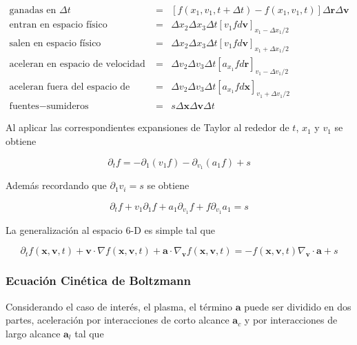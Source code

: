 \begin{eqnarray}
  \text{ganadas en } \Delta t &=& [f(x_1, v_{1}, t + \Delta t) - f(x_1, v_{1}, t)]\Delta\textbf{r}\Delta\textbf{v}\nonumber\\
  \text{entran en espacio f\'isico} &=& \Delta x_{2}\Delta x_{3}\Delta t[v_{1}fd\textbf{v}]_{x_1 - \Delta x_1/2} \nonumber\\
  \text{salen en espacio f\'isico} &=& \Delta x_{2}\Delta x_{3}\Delta t[v_{1}fd\textbf{v}]_{x_1 + \Delta x_1/2} \nonumber\\
  \text{aceleran en espacio de velocidad} &=& \Delta v_{2}\Delta v_{3}\Delta t[a_{x_1}fd\textbf{r}]_{v_{1} - \Delta v_{1}/2} \nonumber\\
  \text{aceleran fuera del espacio de velocidad} &=& \Delta v_{2}\Delta v_{3}\Delta t[a_{x_1}fd\textbf{x}]_{v_{1} + \Delta v_{1}/2} \nonumber\\
  \text{fuentes} - \text{sumideros} &=& s\Delta \textbf{x} \Delta\textbf{v}\Delta t \nonumber
\end{eqnarray}

Al aplicar las correspondientes expansiones de Taylor al rededor de $t$, $x_1$ y $v_1$ se obtiene 

\begin{equation*}
  \partial_t f = -\partial_{1}(v_1 f) - \partial_{v_1} (a_1 f) + s
\end{equation*}

Adem\'as recordando que $\partial_{1}v_i = s$ se obtiene

\begin{equation*}
  \partial_t f + v_1\partial_{1}f + a_1\partial_{v_1} f + f\partial_{v_1}a_1 = s
\end{equation*}
  
La generalizaci\'on al espacio 6-D es simple tal que 

\begin{equation*}
  \partial_t f(\textbf{x},\textbf{v}, t) + \textbf{v}\cdot\nabla f(\textbf{x}, \textbf{v}, t) + \textbf{a}\cdot\nabla_{\textbf{v}} f(\textbf{x}, \textbf{v}, t)= -f(\textbf{x}, \textbf{v}, t)\nabla_\textbf{v}\cdot \textbf{a} + s 
\end{equation*}

\subsubsection{Ecuaci\'on Cin\'etica de Boltzmann}

Considerando el caso de inter\'es, el plasma, el t\'ermino $\textbf{a}$ puede ser dividido en dos partes, aceleraci\'on por interacciones de corto alcance $\textbf{a}_c$ y por interacciones de largo alcance $\textbf{a}_l$ tal que 

